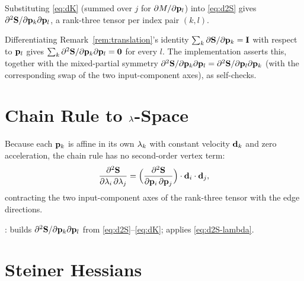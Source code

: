 \documentclass[11pt,a4paper]{article}
\begin{document}
Substituting \eqref{eq:dK} (summed over $j$ for $\partial M/\partial\mathbf{p}_{l}$)
into \eqref{eq:d2S} gives $\partial^2\mathbf{S}/\partial\mathbf{p}_{k}\partial\mathbf{p}_{l}$, a
rank-three tensor per index pair $(k,l)$.

\begin{remark}
\label{rem:translation2}
Differentiating Remark~\ref{rem:translation}'s identity
$\sum_k\partial\mathbf{S}/\partial\mathbf{p}_{k} = \mathbf{I}$ with respect to $\mathbf{p}_{l}$ gives
$\sum_k\partial^2\mathbf{S}/\partial\mathbf{p}_{k}\partial\mathbf{p}_{l} = \mathbf{0}$ for every $l$.
The implementation asserts this, together with the mixed-partial symmetry
$\partial^2\mathbf{S}/\partial\mathbf{p}_{k}\partial\mathbf{p}_{l}
= \partial^2\mathbf{S}/\partial\mathbf{p}_{l}\partial\mathbf{p}_{k}$ (with the corresponding swap of
the two input-component axes), as self-checks.
\end{remark}

\section{Chain Rule to \texorpdfstring{$\lambda$}{lambda}-Space}
\label{sec:lambda}

Because each $\mathbf{p}_{k}$ is affine in its own $\lambda_k$ with constant velocity
$\mathbf{d}_{k}$ and zero acceleration, the chain rule has no second-order vertex
term:
\begin{equation}
  \dfrac{\partial^2 \mathbf{S}}{\partial \lambda_i\,\partial \lambda_j}
    = \Bigl(\dfrac{\partial^2 \mathbf{S}}{\partial \mathbf{p}_{i}\,\partial \mathbf{p}_{j}}\Bigr)\cdot\mathbf{d}_{i}\cdot\mathbf{d}_{j},
  \label{eq:d2S-lambda}
\end{equation}
contracting the two input-component axes of the rank-three tensor with the
edge directions.

\begin{tcolorbox}[colback=blue!4!white, colframe=blue!40!black,
                  title={Code: second derivative of S}, fontupper=\small]
:
 builds
$\partial^2\mathbf{S}/\partial\mathbf{p}_{k}\partial\mathbf{p}_{l}$ from \eqref{eq:d2S}--\eqref{eq:dK};
 applies \eqref{eq:d2S-lambda}.
\end{tcolorbox}

\section{Steiner Hessians}
\label{sec:hessians}
\end{document}
